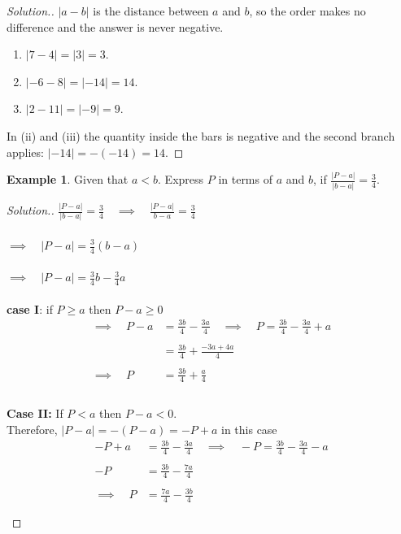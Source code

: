 \documentclass[11pt,a4paper]{article}
\theoremstyle{definition}
\newtheorem{example}[thm]{Example}
\newenvironment{solution}
  {\renewcommand{\qedsymbol}{}\begin{proof}[\textit{Solution}.]}
  {\end{proof}}
\begin{document}
\begin{solution}
$\left|a-b\right|$ is the distance between $a$ and $b$, so the order makes no
difference and the answer is never negative.
\begin{enumerate}
\item[(i).] $\left|7-4\right|=\left|3\right|=3$.
\item[(ii).] $\left|-6-8\right|=\left|-14\right|=14$.
\item[(iii).] $\left|2-11\right|=\left|-9\right|=9$.
\end{enumerate}
In (ii) and (iii) the quantity inside the bars is negative and the second branch
applies: $\left|-14\right|=-(-14)=14$.
\end{solution}
\begin{example}

Given that $a<b$. Express $P$ in terms of $a$ and $b$, if $\frac{|P-a|}{|b-a|}=\frac{3}{4}$.
\end{example}
\begin{solution}

$\frac{|P-a|}{|b-a|}=\frac{3}{4}\quad  \implies \quad  \frac{|P-a|}{b-a}=\frac{3}{4}$\\\\

$\implies \quad  |P-a|=\frac{3}{4}(b-a)$\\\\

$\implies \quad  |P-a|=\frac{3}{4}b-\frac{3}{4}a$\\\\

\textbf{case I}: if $P\geq a$ then $P-a\geq 0$
\begin{align*}
\implies \quad  P-a & = \frac{3b}{4}-\frac{3a}{4}\quad  \implies \quad 
                        P  = \frac{3b}{4}-\frac{3a}{4}+a\\\\
                          & = \frac{3b}{4}+\frac{-3a+4a}{4}\\\\
\implies \quad  P & = \frac{3b}{4}+\frac{a}{4}\\\\
\end{align*}


\textbf{Case II:} If $P<a$ then $P-a<0$.\\
Therefore, $|P-a|=-(P-a)=-P+a$ in this case
\begin{align*}
-P+a & = \frac{3b}{4}-\frac{3a}{4}\quad  \implies \quad  -P=\frac{3b}{4}-\frac{3a}{4}-a\\\\
- P & = \frac{3b}{4}-\frac{7a}{4}\\\\
\implies \quad  P & = \frac{7a}{4}-\frac{3b}{4}\\\\
\end{align*}
\end{solution}
\end{document}
